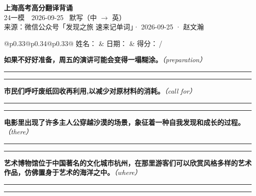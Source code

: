 \documentclass[11pt,a4paper]{article}
\newcommand{\num}[1]{\makebox[1.9em][r]{#1.}\hspace{0.3em}}
\newcommand{\wline}{\noindent\rule{\linewidth}{0.4pt}}
\newcommand{\prompt}[1]{\emph{\textcolor{tipblue}{\small（#1）}}}
\begin{document}
\pagestyle{plain}
\begin{center}
{\LARGE\bfseries 上海高考高分翻译背诵 }\\[0.25em]
{\large 24一模　2026-09-25 \quad\ 默写（中 $\to$ 英）}\\[0.35em]
{\footnotesize 来源：微信公众号「发现之旅 速来记单词」· 2026-09-25 · 赵文瀚}
\end{center}

\vspace{0.4em}
\noindent\begin{tabular}{@{}p{0.33\textwidth}@{}p{0.34\textwidth}@{}p{0.33\textwidth}@{}}
姓名：\underline{\hspace{2.0cm}} & 日期：\underline{\hspace{2.0cm}} & 得分：\underline{\hspace{1.4cm}}\,/ \\
\end{tabular}

\vspace{0.5em}

\vspace{0.8em}
\num{1}\textbf{如果不好好准备，周五的演讲可能会变得一塌糊涂。}\prompt{preparation}

\vspace{0.3em}

\wline\vspace{0.3em}
\wline

\num{2}\textbf{市民们呼吁废纸回收再利用,以减少对原材料的消耗。}\prompt{call for}

\vspace{0.3em}

\wline\vspace{0.3em}
\wline

\num{3}\textbf{电影里出现了许多主人公穿越沙漠的场景，象征着一种自我发现和成长的过程。}\prompt{there}

\vspace{0.3em}

\wline\vspace{0.3em}
\wline

\num{4}\textbf{艺术博物馆位于中国著名的文化城市杭州，在那里游客们可以欣赏风格多样的艺术作品，仿佛置身于艺术的海洋之中。}\prompt{where}

\vspace{0.3em}

\wline\vspace{0.3em}
\wline
\end{document}
